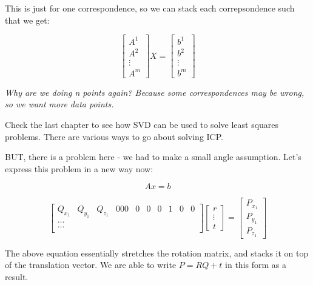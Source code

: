 This is just for one correspondence, so we can stack each correpsondence such that we get:

\begin{equation}
    \begin{bmatrix}
    A^1 \\
    A^2 \\
    \vdots \\
    A^m
    \end{bmatrix} X = \begin{bmatrix}
    b^1 \\
    b^2 \\
    \vdots \\
    b^m
    \end{bmatrix}
\end{equation}

\textit{Why are we doing n points again? Because some correspondences may be wrong, so we want more data points.}

Check the last chapter to see how SVD can be used to solve least squares problems. There are various ways to go about solving ICP.

BUT, there is a problem here - we had to make a small angle assumption. Let's express this problem in a new way now:

\begin{equation*}
    Ax = b
\end{equation*}

\begin{equation}
    \begin{bmatrix}Q_{x_1} & Q_{y_1} & Q_{z_1} & 000 & 0 & 0 & 0 & 1 & 0 & 0 \\
    \hdots \\
    \hdots \\
    \end{bmatrix} \begin{bmatrix}r \\ \vdots \\ t\end{bmatrix} = \begin{bmatrix}P_{x_1} \\ P_{y_1} \\ P_{z_1}\end{bmatrix}
\end{equation}

The above equation essentially stretches the rotation matrix, and stacks it on top of the translation vector. We are able to write $P = RQ + t$ in this form as a result. 

